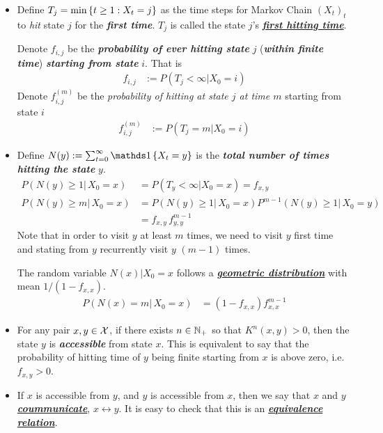 \documentclass[11pt]{article}
\begin{document}
\begin{itemize}
\item Define $T_{j} = \min\left\{t\ge 1: X_{t} = j\right\}$ as the time steps for Markov Chain $(X_t)_t$ to \emph{hit} state $j$ for the \emph{\textbf{first time}}. $T_j$ is called the state $j$'s \underline{\textbf{\emph{first hitting time}}}.

Denote $f_{i,j}$ be the \emph{\textbf{probability of ever hitting state}} $j$ (\emph{\textbf{within finite time}}) \emph{\textbf{starting from state}} $i$. That is
\begin{align}
f_{i,j} &:= P(T_{j} < \infty | X_{0} = i)\label{eqn: mc_hit_time_prob}
\end{align} Denote $f_{i,j}^{(m)}$ be the \emph{probability of hitting at state $j$ at time $m$} starting from state $i$
\begin{align}
f_{i,j}^{(m)} &:= P(T_{j} = m | X_{0} = i)\label{eqn: mc_hit_time_prob_m}
\end{align}

\item Define $N(y):= \sum_{t=0}^{\infty}\ind{X_{t} = y}$ is the \emph{\textbf{total number of times hitting the state}} $y$.
\begin{align}
P(N(y) \ge 1 |\, X_{0} = x) &= P(T_{y} < \infty | X_{0} = x) = f_{x,y} \label{eqn: mc_hit_times} \\
P(N(y) \ge m |\, X_{0} = x) &= P(N(y) \ge 1 |\, X_{0} = x)P^{m-1}(N(y) \ge 1 |\, X_{0} = y) \label{eqn: mc_hit_times_hitting_time_recusion} \\
&=f_{x,y}\, f^{m-1}_{y,y}\nonumber
\end{align} Note that in order to visit $y$ at least $m$ times, we need to visit $y$ first time and stating from $y$ recurrently visit $y$ $(m-1)$ times.

The random variable $N(x)|X_0 = x$ follows a \underline{\textbf{\emph{geometric distribution}}} with mean $1/(1- f_{x,x})$.
\begin{align}
P(N(x) = m |\, X_{0} = x) &= (1- f_{x,x})f^{m-1}_{x,x} \label{eqn: mc_hit_times_m_times_recurrent}
\end{align}

\item For any pair $x, y \in {\mathcal X}$, if there exists $n \in {\mathbb N}_{+}$ so that $K^{n}(x, y) > 0$, then the state $y$ is \emph{\textbf{accessible}} from state $x$. This is equivalent to say that the probability of hitting time of $y$ being finite starting from $x$ is above zero, i.e. \underline{$f_{x,y} >0$}.

\item If $x$ is accessible from $y$, and $y$ is accessible from $x$, then we say that $x$ and $y$ \underline{\emph{\textbf{coummunicate}}},
$x \leftrightarrow y$. It is easy to check that this is an \underline{\emph{\textbf{equivalence relation}}}.


\end{itemize}
\end{document}
